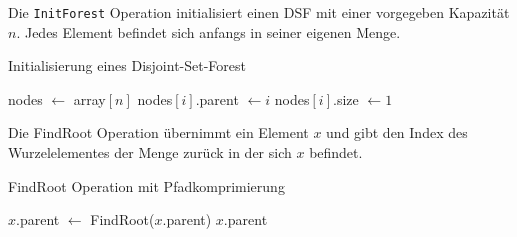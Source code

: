 \documentclass{whswinvcbook}
\begin{document}
Die \texttt{InitForest} Operation initialisiert einen DSF mit einer vorgegeben Kapazität $n$. Jedes Element befindet sich anfangs in seiner eigenen Menge.
\begin{algorithm}[H]
    \caption{Initialisierung eines Disjoint-Set-Forest}\label{alg-dsf-init}
    \begin{algorithmic}
            \State nodes $\gets$ array$[n]$
                \State nodes$[i]$.parent $\gets i$
                \State nodes$[i]$.size $\gets 1$
            \EndFor
        \EndProcedure
    \end{algorithmic}
\end{algorithm}
Die FindRoot Operation übernimmt ein Element $x$ und gibt den Index des Wurzelelementes der Menge zurück in der sich $x$ befindet.
\begin{algorithm}[H]
    \caption{FindRoot Operation mit Pfadkomprimierung}\label{alg-dsf-find}
    \begin{algorithmic}
                \State $x$.parent $\gets$ FindRoot($x$.parent)
            \EndIf
            \State \Return $x$.parent
        \EndFunction
    \end{algorithmic}
\end{algorithm}

\backmatter

\preparebibliography

\end{document}
